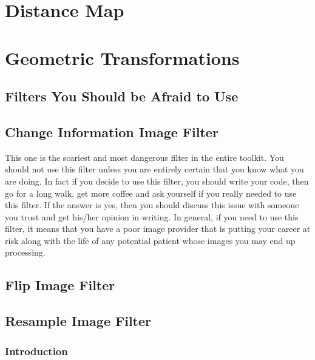 \section{Distance Map}
\label{sec:DistanceMap}






\section{Geometric Transformations}
\label{sec:GeometricalTransformationFilters}

\subsection{Filters You Should be Afraid to Use}

\label{sec:ScaryImageFilters}
\subsection{Change Information Image Filter}

This one is the scariest and most dangerous filter in the entire toolkit. You
should not use this filter unless you are entirely certain that you know what
you are doing. In fact if you decide to use this filter, you should write your
code, then go for a long walk, get more coffee and ask yourself if you really
needed to use this filter. If the answer is yes, then you should discuss this
issue with someone you trust and get his/her opinion in writing.  In general,
if you need to use this filter, it means that you have a poor image provider
that is putting your career at risk along with the life of any potential
patient whose images you may end up processing.

\subsection{Flip Image Filter}



\subsection{Resample Image Filter}
\label{sec:ResampleImageFilter}

\subsubsection{Introduction}



